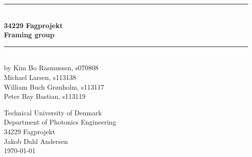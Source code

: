 \begin{titlingpage}
 \centering \parindent=0pt
 \newcommand{\HRule}{\rule{\textwidth}{1mm}}
  \HRule\\[1cm]\Huge\bfseries
 34229 Fagprojekt\\[0.7cm]
 \large Framing group\\[1cm]
 \HRule\\[4cm]  
 \large by Kim Bo Rasmussen, s070808\\
 Michael Larsen, s113138\\
 William Buch Grønholm, s113117\\
 Peter Bay Bastian, s113119\\
  \normalsize %
 \begin{flushleft}
 Technical University of Denmark\\
 Department of Photonics Engineering\\
 34229 Fagprojekt\\
 Jakob Dahl Andersen\\
 \today \end{flushleft}
\end{titlingpage}
